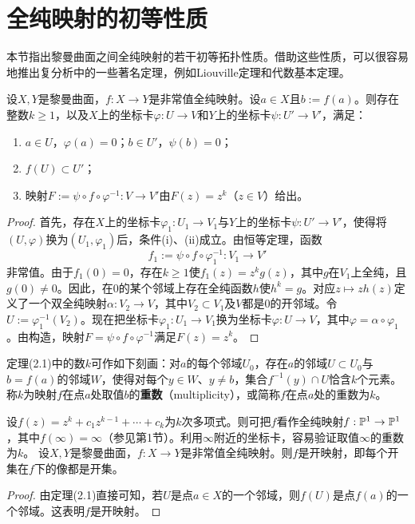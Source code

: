 \section{全纯映射的初等性质}
本节指出黎曼曲面之间全纯映射的若干初等拓扑性质。借助这些性质，可以很容易地推出复分析中的一些著名定理，例如Liouville定理和代数基本定理。

设$X,Y$是黎曼曲面，$f:X\to Y$是非常值全纯映射。设$a\in X$且$b:=f(a)$。则存在整数$k\ge1$，以及$X$上的坐标卡$\varphi:U\to V$和$Y$上的坐标卡$\psi:U'\to V'$，满足：
\begin{enumerate}[label=(\roman*)]
\item $a\in U$，$\varphi(a)=0$；$b\in U'$，$\psi(b)=0$；
\item $f(U)\subset U'$；
\item 映射$F:=\psi\circ f\circ\varphi^{-1}:V\to V'$由$F(z)=z^k$（$z\in V$）给出。
\end{enumerate}
\begin{proof}
首先，存在$X$上的坐标卡$\varphi_1:U_1\to V_1$与$Y$上的坐标卡$\psi:U'\to V'$，使得将$(U,\varphi)$换为$(U_1,\varphi_1)$后，条件(i)、(ii)成立。由恒等定理，函数
\[
f_1:=\psi\circ f\circ\varphi_1^{-1}:V_1\to V'
\]
非常值。由于$f_1(0)=0$，存在$k\ge1$使$f_1(z)=z^kg(z)$，其中$g$在$V_1$上全纯，且$g(0)\ne0$。因此，在0的某个邻域上存在全纯函数$h$使$h^k=g$。对应$z\mapsto zh(z)$定义了一个双全纯映射$\alpha:V_2\to V$，其中$V_2\subset V_1$及$V$都是0的开邻域。令$U:=\varphi_1^{-1}(V_2)$。现在把坐标卡$\varphi_1:U_1\to V_1$换为坐标卡$\varphi:U\to V$，其中$\varphi=\alpha\circ\varphi_1$。由构造，映射$F=\psi\circ f\circ\varphi^{-1}$满足$F(z)=z^k$。
\end{proof}

定理(2.1)中的数$k$可作如下刻画：对$a$的每个邻域$U_0$，存在$a$的邻域$U\subset U_0$与$b=f(a)$的邻域$W$，使得对每个$y\in W$、$y\ne b$，集合$f^{-1}(y)\cap U$恰含$k$个元素。称$k$为映射$f$在点$a$处取值$b$的\textbf{重数}（multiplicity），或简称$f$在点$a$处的重数为$k$。

设$f(z)=z^k+c_1z^{k-1}+\cdots+c_k$为$k$次多项式。则可把$f$看作全纯映射$f:\mathbb P^1\to\mathbb P^1$，其中$f(\infty)=\infty$（参见第1节）。利用$\infty$附近的坐标卡，容易验证取值$\infty$的重数为$k$。
设$X,Y$是黎曼曲面，$f:X\to Y$是非常值全纯映射。则$f$是开映射，即每个开集在$f$下的像都是开集。
\begin{proof}
由定理(2.1)直接可知，若$U$是点$a\in X$的一个邻域，则$f(U)$是点$f(a)$的一个邻域。这表明$f$是开映射。
\end{proof}


